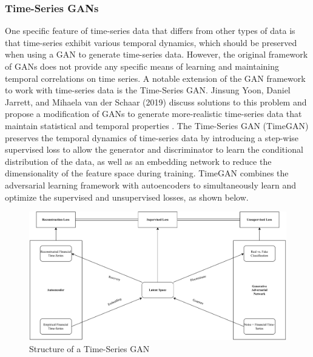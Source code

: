 \subsubsection{Time-Series GANs}
One specific feature of time-series data that differs from other types of data is that time-series exhibit various temporal dynamics, which should be preserved when using a GAN to generate time-series data. However, the original framework of GANs does not provide any specific means of learning and maintaining temporal correlations on time series. A notable extension of the GAN framework to work with time-series data is the Time-Series GAN. Jinsung Yoon, Daniel Jarrett, and Mihaela van der Schaar (2019) discuss solutions to this problem and propose a modification of GANs to generate more-realistic time-series data that maintain statistical and temporal properties \cite{tsgan}. The Time-Series GAN (TimeGAN) preserves the temporal dynamics of time-series data by introducing a step-wise supervised loss to allow the generator and discriminator to learn the conditional distribution of the data, as well as an embedding network to reduce the dimensionality of the feature space during training. TimeGAN combines the adversarial learning framework with autoencoders to simultaneously learn and optimize the supervised and unsupervised losses, as shown below.
\begin{figure}[H]
\centering
\includegraphics[width=15cm]{templates/assets/gan/tsgan_architecture.png}
\caption{Structure of a Time-Series GAN}
\end{figure}


